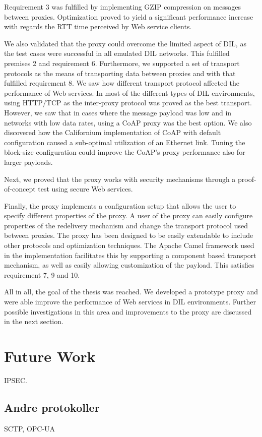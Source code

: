 Requirement 3 was fulfilled by implementing GZIP compression on messages between
proxies. Optimization proved to yield a significant performance increase with
regards the RTT time perceived by Web service clients.

We also validated that the proxy could overcome the limited aspect of DIL, as
the test cases were successful in all emulated DIL networks. This fulfilled
premises 2 and requirement 6. Furthermore, we supported a set of transport
protocols as the means of transporting data between proxies and with that
fulfilled requirement 8. We saw how different transport protocol affected the
performance of Web services. In most of the different types of DIL environments,
using HTTP/TCP as the inter-proxy protocol was proved as the best transport.
However, we saw that in cases where the message payload was low and in networks
with low data rates, using a CoAP proxy was the best option. We also discovered
how the Californium implementation of CoAP with default configuration caused a
sub-optimal utilization of an Ethernet link. Tuning the block-size configuration
could improve the CoAP's proxy performance also for larger payloads.

Next, we proved that the proxy works with security mechanisms through a
proof-of-concept test using secure Web services.

Finally, the proxy implements a configuration setup that allows the user to
specify different properties of the proxy. A user of the proxy can easily
configure properties of the redelivery mechanism and change the transport
protocol used between proxies. The proxy has been designed to be easily
extendable to include other protocols and optimization techniques. The Apache
Camel framework used in the implementation facilitates this by supporting a
component based transport mechanism, as well as easily allowing customization of
the payload. This satisfies requirement 7, 9 and 10.


All in all, the goal of the thesis was reached. We developed a prototype proxy
and were able improve the performance of Web services in DIL environments.
Further possible investigations in this area and improvements to the proxy are
discussed in the next section.


\section{Future Work}
IPSEC.

\subsection{Andre protokoller}
SCTP, OPC-UA

